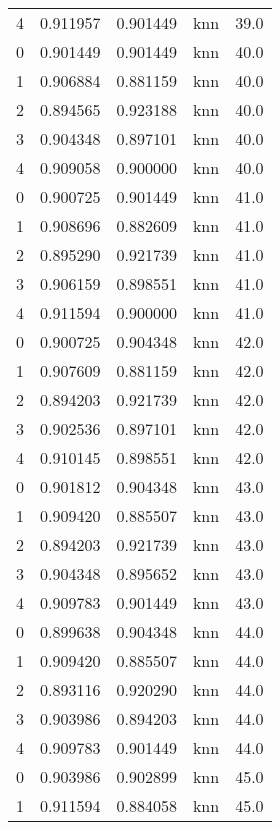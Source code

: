 \begin{tabular}{rrrlr}
     4 & 0.911957 & 0.901449 &      knn &       39.0 \\
     0 & 0.901449 & 0.901449 &      knn &       40.0 \\
     1 & 0.906884 & 0.881159 &      knn &       40.0 \\
     2 & 0.894565 & 0.923188 &      knn &       40.0 \\
     3 & 0.904348 & 0.897101 &      knn &       40.0 \\
     4 & 0.909058 & 0.900000 &      knn &       40.0 \\
     0 & 0.900725 & 0.901449 &      knn &       41.0 \\
     1 & 0.908696 & 0.882609 &      knn &       41.0 \\
     2 & 0.895290 & 0.921739 &      knn &       41.0 \\
     3 & 0.906159 & 0.898551 &      knn &       41.0 \\
     4 & 0.911594 & 0.900000 &      knn &       41.0 \\
     0 & 0.900725 & 0.904348 &      knn &       42.0 \\
     1 & 0.907609 & 0.881159 &      knn &       42.0 \\
     2 & 0.894203 & 0.921739 &      knn &       42.0 \\
     3 & 0.902536 & 0.897101 &      knn &       42.0 \\
     4 & 0.910145 & 0.898551 &      knn &       42.0 \\
     0 & 0.901812 & 0.904348 &      knn &       43.0 \\
     1 & 0.909420 & 0.885507 &      knn &       43.0 \\
     2 & 0.894203 & 0.921739 &      knn &       43.0 \\
     3 & 0.904348 & 0.895652 &      knn &       43.0 \\
     4 & 0.909783 & 0.901449 &      knn &       43.0 \\
     0 & 0.899638 & 0.904348 &      knn &       44.0 \\
     1 & 0.909420 & 0.885507 &      knn &       44.0 \\
     2 & 0.893116 & 0.920290 &      knn &       44.0 \\
     3 & 0.903986 & 0.894203 &      knn &       44.0 \\
     4 & 0.909783 & 0.901449 &      knn &       44.0 \\
     0 & 0.903986 & 0.902899 &      knn &       45.0 \\
     1 & 0.911594 & 0.884058 &      knn &       45.0 \\

\end{tabular}
